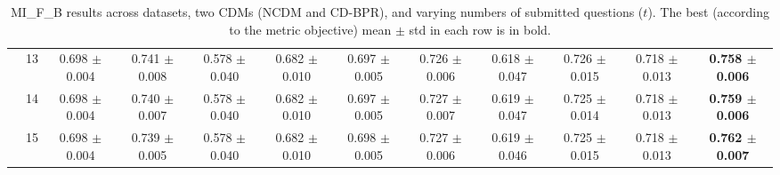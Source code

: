 \begin{table*}[t]
{\begin{tabular}{%
  ll
  @{\quad}
  c@{\hskip 4pt}c
  @{\quad\quad}
  c@{\hskip 4pt}c
  @{\quad\quad}
  c@{\hskip 4pt}c
  @{\quad\quad}
  c@{\hskip 4pt}c
  @{\quad\quad}
  c@{\hskip 4pt}c
}
        & 13 & 0.698 $\pm$ 0.004 & 0.741 $\pm$ 0.008 & 0.578 $\pm$ 0.040 & 0.682 $\pm$ 0.010 & 0.697 $\pm$ 0.005 & 0.726 $\pm$ 0.006 & 0.618 $\pm$ 0.047 & 0.726 $\pm$ 0.015 & 0.718 $\pm$ 0.013 & \textbf{0.758 $\pm$ 0.006} \\
        & 14 & 0.698 $\pm$ 0.004 & 0.740 $\pm$ 0.007 & 0.578 $\pm$ 0.040 & 0.682 $\pm$ 0.010 & 0.697 $\pm$ 0.005 & 0.727 $\pm$ 0.007 & 0.619 $\pm$ 0.047 & 0.725 $\pm$ 0.014 & 0.718 $\pm$ 0.013 & \textbf{0.759 $\pm$ 0.006} \\
        & 15 & 0.698 $\pm$ 0.004 & 0.739 $\pm$ 0.005 & 0.578 $\pm$ 0.040 & 0.682 $\pm$ 0.010 & 0.698 $\pm$ 0.005 & 0.727 $\pm$ 0.006 & 0.619 $\pm$ 0.046 & 0.725 $\pm$ 0.015 & 0.718 $\pm$ 0.013 & \textbf{0.762 $\pm$ 0.007} \\
\bottomrule
\end{tabular}
}
\caption{MI_F_B results across datasets, two CDMs (NCDM and CD-BPR), and varying numbers of submitted questions ($t$). The best (according to the metric objective) mean $\pm$ std in each row is in bold.}
\label{tab:results-mi_f_b}
\end{table*}


